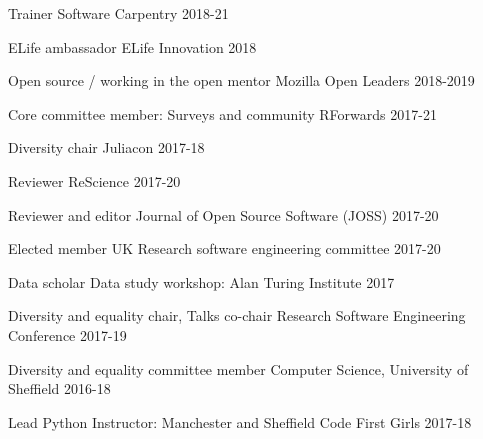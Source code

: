 \begin{cvpress}
\cvpres
{Trainer} %
{Software Carpentry}
{2018-21}

\cvpres
{ELife ambassador}
{ELife Innovation}
{2018}

\cvpres
{Open source / working in the open mentor} %
{Mozilla Open Leaders} %
{2018-2019} %

\cvpres
{Core committee member: Surveys and community} %
{RForwards}
{2017-21} %

\cvpres
{Diversity chair} %
{Juliacon} %
{2017-18} %

\cvpres
{Reviewer} %
{ReScience} %
{2017-20} %


\cvpres
{Reviewer and editor} %
{Journal of Open Source Software (JOSS)} %
{2017-20} %



\cvpres
{Elected member} %
{UK Research software engineering committee} %
{2017-20} %

\cvpres
{Data scholar} %
{Data study workshop: Alan Turing Institute} %
{2017} %


\cvpres
{Diversity and equality chair, Talks co-chair} %
{Research Software Engineering Conference} %
{2017-19} %


\cvpres
{Diversity and equality committee member} %
{Computer Science, University of Sheffield} %
{2016-18} %


\cvpres
{Lead Python Instructor: Manchester and Sheffield} %
{Code First Girls} %
{2017-18} %




\end{cvpress}
